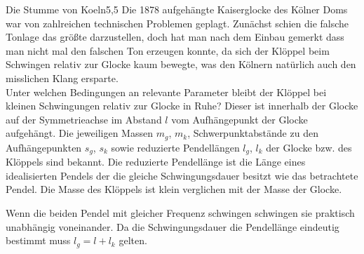 \begin{problem}{Die Stumme von Koeln}{5,5}
Die 1878 aufgehängte Kaiserglocke des Kölner Doms war von zahlreichen technischen Problemen geplagt. Zunächst schien die falsche Tonlage das größte darzustellen, doch hat man nach dem Einbau gemerkt dass man nicht mal den falschen Ton erzeugen konnte, da sich der Klöppel beim Schwingen relativ zur Glocke kaum bewegte, was den Kölnern natürlich auch den misslichen Klang ersparte.\\
Unter welchen Bedingungen an relevante Parameter bleibt der Klöppel bei kleinen Schwingungen relativ zur Glocke in Ruhe? Dieser ist innerhalb der Glocke auf der Symmetrieachse im Abstand $l$ vom Aufhängepunkt der Glocke aufgehängt. Die jeweiligen Massen $m_g$, $m_k$, Schwerpunktabstände zu den Aufhängepunkten $s_g$, $s_k$ sowie reduzierte Pendellängen $l_g$, $l_k$ der Glocke bzw. des Klöppels sind bekannt. \hinweis Die reduzierte Pendellänge ist die Länge eines idealisierten Pendels der die gleiche Schwingungsdauer besitzt wie das betrachtete Pendel. Die Masse des Klöppels ist klein verglichen  mit der Masse der Glocke.
\begin{solution}
Wenn die beiden Pendel mit gleicher Frequenz schwingen schwingen sie praktisch unabhängig voneinander. Da die Schwingungsdauer die Pendellänge eindeutig bestimmt muss $l_g = l + l_k$ gelten.
\end{solution}
\end{problem}

